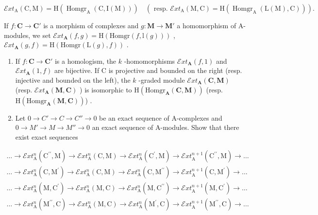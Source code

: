 \[
\mathcal {E} x t _ {\mathrm{A}} (\mathrm{C}, \mathrm{M}) = \mathrm{H} (\operatorname{Homgr} _ {\mathrm{A}} (\mathrm{C}, \mathrm{I} (\mathrm{M}))) \quad \left(\text { resp. } \mathcal {E} x t _ {\mathrm{A}} (\mathrm{M}, \mathrm{C}) = \mathrm{H} (\operatorname{Homgr} _ {\mathrm{A}} (\mathrm{L} (\mathrm{M}), \mathrm{C}))\right).
\]

If \(f: \mathbf{C} \to \mathbf{C}'\) is a morphism of complexes and \(g: \mathbf{M} \to \mathbf{M}'\) a homomorphism of A-modules, we set \(\mathcal{E}xt_{\mathbf{A}}(f, g) = \mathrm{H}(\mathrm{Homgr}(f, \mathrm{l}(g)))\) , \(\mathcal{E}xt_{\mathbf{A}}(g, f) = \mathrm{H}(\mathrm{Homgr}(\mathrm{L}(g), f))\) .

\begin{enumerate}
\def\labelenumi{\alph{enumi})}
\item
  If \(f: \mathbf{C} \to \mathbf{C}'\) is a homologism, the \(k\) -homomorphisms \(\mathcal{E}xt_{\mathbf{A}}(f, 1)\) and \(\mathcal{E}xt_{\mathbf{A}}(1, f)\) are bijective. If C is projective and bounded on the right (resp. injective and bounded on the left), the \(k\) -graded module \(\mathcal{E}xt_{\mathbf{A}}(\mathbf{C}, \mathbf{M})\) (resp. \(\mathcal{E}xt_{\mathbf{A}}(\mathbf{M}, \mathbf{C})\) ) is isomorphic to \(\mathrm{H}(\mathrm{Homgr}_{\mathbf{A}}(\mathbf{C}, \mathbf{M}))\) (resp. \(\mathrm{H}(\mathrm{Homgr}_{\mathbf{A}}(\mathbf{M}, \mathbf{C}))\)) .
\item
  Let \(0 \to C' \to C \to C'' \to 0\) be an exact sequence of A-complexes and \(0 \to M' \to M \to M'' \to 0\) an exact sequence of A-modules. Show that there exist exact sequences
\end{enumerate}

\[
\begin{array}{l} \dots \to \mathcal {E} x t _ {\mathrm{A}} ^ {n} (\mathrm{C} ^ {\prime \prime}, \mathrm{M}) \to \mathcal {E} x t _ {\mathrm{A}} ^ {n} (\mathrm{C}, \mathrm{M}) \to \mathcal {E} x t _ {\mathrm{A}} ^ {n} (\mathrm{C} ^ {\prime}, \mathrm{M}) \to \mathcal {E} x t _ {\mathrm{A}} ^ {n + 1} (\mathrm{C} ^ {\prime \prime}, \mathrm{M}) \to \dots \\ \dots \to \mathcal {E} x t _ {\mathrm{A}} ^ {n} (\mathrm{C}, \mathrm{M} ^ {\prime}) \to \mathcal {E} x t _ {\mathrm{A}} ^ {n} (\mathrm{C}, \mathrm{M}) \to \mathcal {E} x t _ {\mathrm{A}} ^ {n} (\mathrm{C}, \mathrm{M} ^ {\prime \prime}) \to \mathcal {E} x t _ {\mathrm{A}} ^ {n + 1} (\mathrm{C}, \mathrm{M} ^ {\prime}) \to \dots \\ \dots \to \mathcal {E} x t _ {\mathrm{A}} ^ {n} (\mathrm{M}, \mathrm{C} ^ {\prime}) \to \mathcal {E} x t _ {\mathrm{A}} ^ {n} (\mathrm{M}, \mathrm{C}) \to \mathcal {E} x t _ {\mathrm{A}} ^ {n} (\mathrm{M}, \mathrm{C} ^ {\prime \prime}) \to \mathcal {E} x t _ {\mathrm{A}} ^ {n + 1} (\mathrm{M}, \mathrm{C} ^ {\prime}) \to \dots \\ \dots \to \mathcal {E} x t _ {\mathrm{A}} ^ {n} (\mathrm{M} ^ {\prime \prime}, \mathrm{C}) \to \mathcal {E} x t _ {\mathrm{A}} ^ {n} (\mathrm{M}, \mathrm{C}) \to \mathcal {E} x t _ {\mathrm{A}} ^ {n} (\mathrm{M} ^ {\prime}, \mathrm{C}) \to \mathcal {E} x t _ {\mathrm{A}} ^ {n + 1} (\mathrm{M} ^ {\prime \prime}, \mathrm{C}) \to \dots \end{array}
\]


